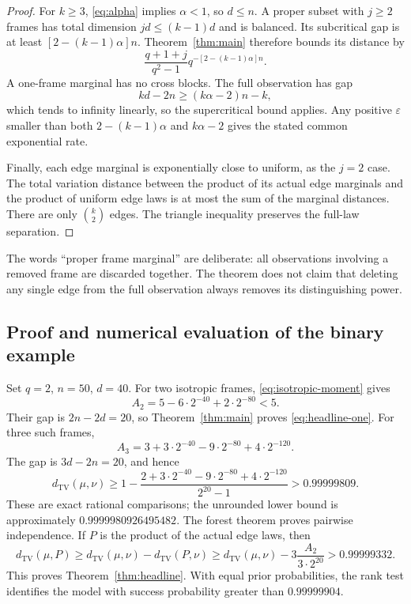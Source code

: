 \documentclass[11pt,letterpaper]{article}
\theoremstyle{definition}
\theoremstyle{remark}
\newcommand{\TV}{d_{\mathrm{TV}}}
\begin{document}
\begin{proof}
For $k\ge3$, \eqref{eq:alpha} implies $\alpha<1$, so $d\le n$. A proper subset with $j\ge2$ frames has total dimension $jd\le(k-1)d$ and is balanced. Its subcritical gap is at least $[2-(k-1)\alpha]n$. Theorem~\ref{thm:main} therefore bounds its distance by
\[
 \frac{q+1+j}{q^2-1}q^{-[2-(k-1)\alpha]n}.
\]
A one-frame marginal has no cross blocks. The full observation has gap
\[
 kd-2n\ge(k\alpha-2)n-k,
\]
which tends to infinity linearly, so the supercritical bound applies. Any positive $\varepsilon$ smaller than both $2-(k-1)\alpha$ and $k\alpha-2$ gives the stated common exponential rate.

Finally, each edge marginal is exponentially close to uniform, as the $j=2$ case. The total variation distance between the product of its actual edge marginals and the product of uniform edge laws is at most the sum of the marginal distances. There are only $\binom k2$ edges. The triangle inequality preserves the full-law separation.
\end{proof}

The words ``proper frame marginal'' are deliberate: all observations involving a removed frame are discarded together. The theorem does not claim that deleting any single edge from the full observation always removes its distinguishing power.

\subsection{Proof and numerical evaluation of the binary example}

Set $q=2$, $n=50$, $d=40$. For two isotropic frames, \eqref{eq:isotropic-moment} gives
\[
 A_2=5-6\cdot2^{-40}+2\cdot2^{-80}<5.
\]
Their gap is $2n-2d=20$, so Theorem~\ref{thm:main} proves \eqref{eq:headline-one}. For three such frames,
\[
 A_3=3+3\cdot2^{-40}-9\cdot2^{-80}+4\cdot2^{-120}.
\]
The gap is $3d-2n=20$, and hence
\begin{equation}\label{eq:headline-rational}
 \TV(\mu,\nu)\ge
 1-\frac{2+3\cdot2^{-40}-9\cdot2^{-80}+4\cdot2^{-120}}{2^{20}-1}
 >0.99999809.
\end{equation}
These are exact rational comparisons; the unrounded lower bound is approximately $0.9999980926495482$. The forest theorem proves pairwise independence. If $P$ is the product of the actual edge laws, then
\[
 \TV(\mu,P)\ge\TV(\mu,\nu)-\TV(P,\nu)
 \ge\TV(\mu,\nu)-3\frac{A_2}{3\cdot2^{20}}>0.99999332.
\]
This proves Theorem~\ref{thm:headline}. With equal prior probabilities, the rank test identifies the model with success probability greater than $0.99999904$.
\end{document}
